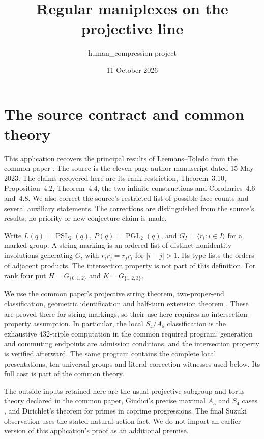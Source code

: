 \documentclass[11pt]{article}
\title{Regular maniplexes on the projective line}
\author{human\_compression project}
\date{11 October 2026}
\newcommand{\PSL}{\operatorname{PSL}_2}
\newcommand{\PGL}{\operatorname{PGL}_2}
\newcommand{\gen}[1]{\langle #1\rangle}
\begin{document}
\maketitle

\section{The source contract and common theory}
This application recovers the principal results of Leemans--Toledo
\cite{LT} from the common paper \cite{U}. The source is the eleven-page
author manuscript dated 15 May 2023. The claims recovered here are its
rank restriction, Theorem~3.10, Proposition~4.2, Theorem~4.4, the two
infinite constructions and Corollaries~4.6 and~4.8. We also correct the
source's restricted list of possible face counts and several auxiliary
statements. The corrections are distinguished from the source's results;
no priority or new conjecture claim is made.

Write $L(q)=\PSL(q)$, $P(q)=\PGL(q)$, and
$G_I=\gen{r_i:i\in I}$ for a marked group. A string marking is an ordered
list of distinct nonidentity involutions generating $G$, with
$r_i r_j=r_j r_i$ for $|i-j|>1$. Its type lists the orders of adjacent
products. The intersection property is not part of this definition.
For rank four put $H=G_{\{0,1,2\}}$ and $K=G_{\{1,2,3\}}$.

We use the common paper's projective string theorem, two-proper-end
classification, geometric identification and half-turn extension theorem
\cite[Theorems~4, 6, 8, 9 and Corollary~7]{U}. These are proved there for string markings,
so their use here requires no intersection-property assumption. In
particular, the local $S_4/A_5$ classification is the exhaustive
$432$-triple computation in the common required program: generation and
commuting endpoints are admission conditions, and the intersection
property is verified afterward. The same program contains the complete
local presentations, ten universal groups and literal correction witnesses
used below. Its full cost is part of the common theory.

The outside inputs retained here are the usual projective subgroup and
torus theory declared in the common paper, Giudici's precise maximal
$A_5$ and $S_4$ cases \cite[Theorem~2.2(6),(8)]{Giudici}, and Dirichlet's
theorem for primes in coprime progressions. The final Suzuki observation
uses the stated natural-action fact. We do not import an earlier version
of this application's proof as an additional premise.
\end{document}

